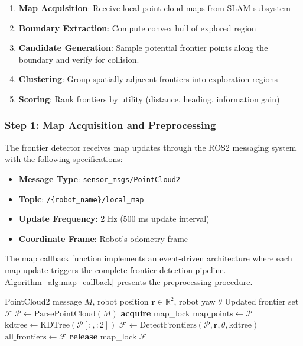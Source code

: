 \documentclass[11pt]{article}
\begin{document}
\begin{enumerate}[noitemsep]
	\item \textbf{Map Acquisition}: Receive local point cloud maps from SLAM subsystem
	\item \textbf{Boundary Extraction}: Compute convex hull of explored region
	\item \textbf{Candidate Generation}: Sample potential frontier points along the boundary and verify for collision.
	\item \textbf{Clustering}: Group spatially adjacent frontiers into exploration regions
	\item \textbf{Scoring}: Rank frontiers by utility (distance, heading, information gain)
\end{enumerate}

\subsubsection{Step 1: Map Acquisition and Preprocessing}

The frontier detector receives map updates through the ROS2 messaging system with the following specifications:

\begin{itemize}[noitemsep]
	\item \textbf{Message Type}: \texttt{sensor\_msgs/PointCloud2}
	\item \textbf{Topic}: \texttt{/\{robot\_name\}/local\_map}
	\item \textbf{Update Frequency}: 2 Hz (500 ms update interval)
	\item \textbf{Coordinate Frame}: Robot's odometry frame
\end{itemize}

The map callback function implements an event-driven architecture where each map update triggers the complete frontier detection pipeline. Algorithm~\ref{alg:map_callback} presents the preprocessing procedure.

\begin{algorithm}[htbp]
	\caption{Map Acquisition and Preprocessing}
	\label{alg:map_callback}
	\begin{algorithmic}[1]
		\Require PointCloud2 message $M$, robot position $\mathbf{r} \in \mathbb{R}^2$, robot yaw $\theta$
		\Ensure Updated frontier set $\mathcal{F}$
		\State $\mathcal{P} \gets \text{ParsePointCloud}(M)$ 
		\State \Return {}
		\EndIf
		\State \textbf{acquire} map\_lock
		\State $\text{map\_points} \gets \mathcal{P}$
		\State $\text{kdtree} \gets \text{KDTree}(\mathcal{P}[:, :2])$ 
		\State $\mathcal{F} \gets \text{DetectFrontiers}(\mathcal{P}, \mathbf{r}, \theta, \text{kdtree})$
		\State $\text{all\_frontiers} \gets \mathcal{F}$
		\State \textbf{release} map\_lock
		\State \Return $\mathcal{F}$
		\EndFunction
	\end{algorithmic}
\end{algorithm}
\end{document}
